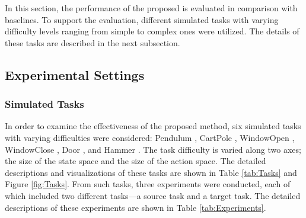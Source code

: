 In this section,
the performance of the proposed \TAIL{} is evaluated in comparison with baselines.
To support the evaluation,
different simulated tasks with varying difficulty levels ranging from simple to complex ones were utilized.
The details of these tasks are described in the next subsection.

\subsection{Experimental Settings}
\subsubsection{Simulated Tasks}


In order to examine the effectiveness of the proposed method,
six simulated tasks with varying difficulties were considered:
Pendulum \cite{Env_OpenAIGym},
CartPole \cite{Env_OpenAIGym, Env_CartPole},
WindowOpen \cite{Env_MetaWorld},
WindowClose \cite{Env_MetaWorld},
Door \cite{Env_Adroit},
and Hammer \cite{Env_Adroit}.
The task difficulty is varied along two axes;
the size of the state space and the size of the action space.
The detailed descriptions and visualizations of these tasks are shown in Table \ref{tab:Tasks} and Figure \ref{fig:Tasks}.
From such tasks,
three experiments were conducted,
each of which included two different tasks---a source task and a target task.
The detailed descriptions of these experiments are shown in Table \ref{tab:Experiments}.

